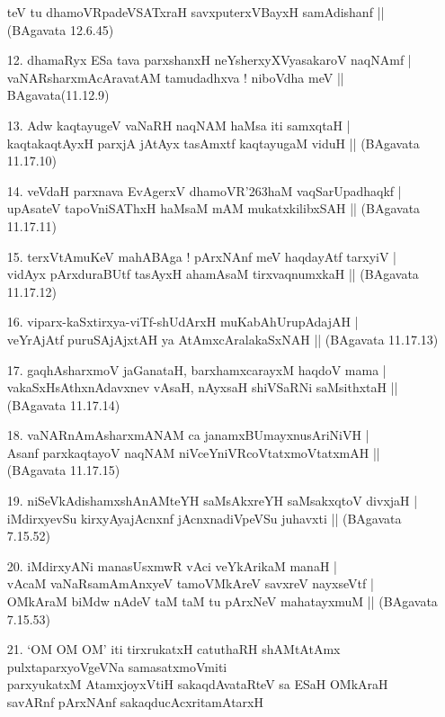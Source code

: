 \begin{itemize}
teV tu dhamoVRpadeVSATxraH savxputerxVBayxH samAdishanf ||
\hfill{(BAgavata 12.6.45)}
\item[12.] dhamaRyx ESa tava parxshanxH neYsherxyXVyasakaroV naqNAmf |\\
vaNARsharxmAcAravatAM tamudadhxva ! niboVdha meV ||
\hfill{BAgavata(11.12.9)}
\item[13.] Adw kaqtayugeV vaNaRH naqNAM haMsa iti samxqtaH |\\
kaqtakaqtAyxH parxjA jAtAyx tasAmxtf kaqtayugaM viduH ||
\hfill{(BAgavata 11.17.10)}
\item[14.] veVdaH parxnava EvAgerxV dhamoVR\char'263haM vaqSarUpadhaqkf |\\
upAsateV tapoVniSAThxH haMsaM mAM mukatxkilibxSAH ||
\hfill{(BAgavata 11.17.11)}
\item[15.] terxVtAmuKeV mahABAga ! pArxNAnf meV haqdayAtf tarxyiV |\\
vidAyx pArxduraBUtf tasAyxH ahamAsaM tirxvaqnumxkaH ||
\hfill{(BAgavata 11.17.12)}
\item[16.] viparx-kaSxtirxya-viTf-shUdArxH muKabAhUrupAdajAH |\\
veYrAjAtf puruSAjAjxtAH ya AtAmxcAralakaSxNAH ||
\hfill{(BAgavata 11.17.13)}
\item[17.] gaqhAsharxmoV jaGanataH, barxhamxcarayxM haqdoV mama |\\
vakaSxHsAthxnAdavxnev vAsaH, nAyxsaH shiVSaRNi saMsithxtaH ||
\hfill{(BAgavata 11.17.14)}
\item[18.] vaNARnAmAsharxmANAM ca janamxBUmayxnusAriNiVH |\\
Asanf parxkaqtayoV naqNAM niVceYniVRcoVtatxmoVtatxmAH ||
\hfill{(BAgavata 11.17.15)}
\item[19.] niSeVkAdishamxshAnAMteYH saMsAkxreYH saMsakxqtoV divxjaH |\\
iMdirxyevSu kirxyAyajAcnxnf jAcnxnadiVpeVSu juhavxti ||
\hfill{(BAgavata 7.15.52)}
\item[20.] iMdirxyANi manasUsxmwR vAci veYkArikaM manaH |\\
vAcaM vaNaRsamAmAnxyeV tamoVMkAreV savxreV nayxseVtf |\\
OMkAraM biMdw nAdeV taM taM tu pArxNeV mahatayxmuM ||
\hfill{(BAgavata 7.15.53)}
\item[21.] `OM OM OM' iti tirxrukatxH catuthaRH shAMtAtAmx\\
pulxtaparxyoVgeVNa samasatxmoVmiti\\
parxyukatxM AtamxjoyxVtiH sakaqdAvataRteV sa ESaH OMkAraH\\
savARnf pArxNAnf sakaqducAcxritamAtarxH \\

\end{itemize}
